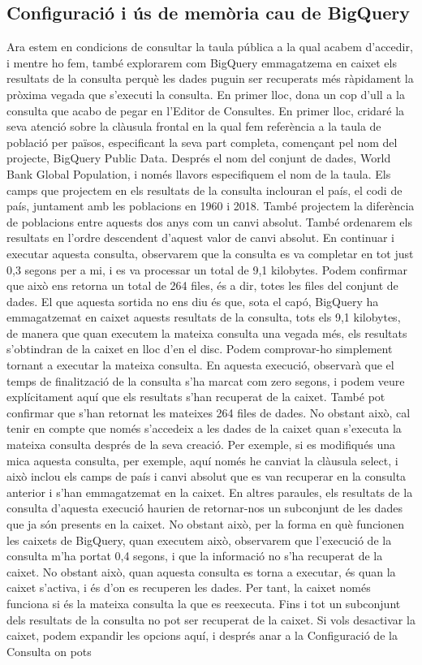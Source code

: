 \documentclass[12pt,longbibliography]{article}
\theoremstyle{definition}
\theoremstyle{remark}
\begin{document}
\subsection{Configuració i ús de memòria cau de BigQuery}

Ara estem en condicions de consultar la taula pública a la qual acabem d'accedir, i mentre ho fem, també explorarem com BigQuery emmagatzema en caixet els resultats de la consulta perquè les dades puguin ser recuperats més ràpidament la pròxima vegada que s'executi la consulta. En primer lloc, dona un cop d'ull a la consulta que acabo de pegar en l'Editor de Consultes. En primer lloc, cridaré la seva atenció sobre la clàusula frontal en la qual fem referència a la taula de població per països, especificant la seva part completa, començant pel nom del projecte, BigQuery Public Data. Després el nom del conjunt de dades, World Bank Global Population, i només llavors especifiquem el nom de la taula. Els camps que projectem en els resultats de la consulta inclouran el país, el codi de país, juntament amb les poblacions en 1960 i 2018. També projectem la diferència de poblacions entre aquests dos anys com un canvi absolut. També ordenarem els resultats en l'ordre descendent d'aquest valor de canvi absolut. En continuar i executar aquesta consulta, observarem que la consulta es va completar en tot just 0,3 segons per a mi, i es va processar un total de 9,1 kilobytes. Podem confirmar que això ens retorna un total de 264 files, és a dir, totes les files del conjunt de dades. El que aquesta sortida no ens diu és que, sota el capó, BigQuery ha emmagatzemat en caixet aquests resultats de la consulta, tots els 9,1 kilobytes, de manera que quan executem la mateixa consulta una vegada més, els resultats s'obtindran de la caixet en lloc d'en el disc. Podem comprovar-ho simplement tornant a executar la mateixa consulta. En aquesta execució, observarà que el temps de finalització de la consulta s'ha marcat com zero segons, i podem veure explícitament aquí que els resultats s'han recuperat de la caixet. També pot confirmar que s'han retornat les mateixes 264 files de dades. No obstant això, cal tenir en compte que només s'accedeix a les dades de la caixet quan s'executa la mateixa consulta després de la seva creació. Per exemple, si es modifiqués una mica aquesta consulta, per exemple, aquí només he canviat la clàusula select, i això inclou els camps de país i canvi absolut que es van recuperar en la consulta anterior i s'han emmagatzemat en la caixet. En altres paraules, els resultats de la consulta d'aquesta execució haurien de retornar-nos un subconjunt de les dades que ja són presents en la caixet. No obstant això, per la forma en què funcionen les caixets de BigQuery, quan executem això, observarem que l'execució de la consulta m'ha portat 0,4 segons, i que la informació no s'ha recuperat de la caixet. No obstant això, quan aquesta consulta es torna a executar, és quan la caixet s'activa, i és d'on es recuperen les dades. Per tant, la caixet només funciona si és la mateixa consulta la que es reexecuta. Fins i tot un subconjunt dels resultats de la consulta no pot ser recuperat de la caixet. Si vols desactivar la caixet, podem expandir les opcions aquí, i després anar a la Configuració de la Consulta on pots 
\end{document}
